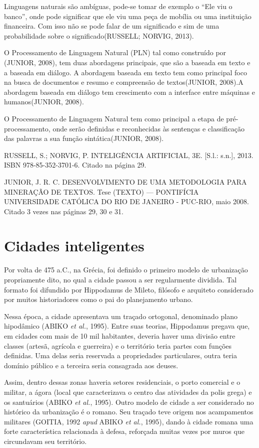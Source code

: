 Linguagens naturais são ambíguas, pode-se tomar de exemplo o “Ele viu o banco”, onde pode significar que ele viu uma peça de mobília ou uma instituição financeira. Com isso não se pode falar de um significado e sim de uma probabilidade sobre o significado(RUSSELL; NORVIG, 2013).

O Processamento de Linguagem Natural (PLN) tal como construído por (JUNIOR, 2008), tem duas abordagens principais, que são a baseada em texto e a baseada em diálogo. A abordagem baseada em texto tem como principal foco na busca de documentos e resumo e compreensão de textos(JUNIOR, 2008).A abordagem baseada em diálogo tem crescimento com a interface entre máquinas e humanos(JUNIOR, 2008). 

O Processamento de Linguagem Natural tem como principal a etapa de pré-processamento, onde serão definidas e reconhecidas às sentenças e classificação das palavras a sua função sintática(JUNIOR, 2008).

RUSSELL, S.; NORVIG, P. INTELIGÊNCIA ARTIFICIAL, 3E. [S.l.: s.n.], 2013. ISBN
978-85-352-3701-6. Citado na página 29.

JUNIOR, J. R. C. DESENVOLVIMENTO DE UMA METODOLOGIA PARA
MINERAÇÃO DE TEXTOS. Tese (TEXTO) — PONTIFÍCIA UNIVERSIDADE
CATÓLICA DO RIO DE JANEIRO - PUC-RIO, maio 2008. Citado 3 vezes nas páginas
29, 30 e 31.

\section{Cidades inteligentes} \label{s:cidades_inteligentes}

Por volta de 475 a.C., na Grécia, foi definido o primeiro modelo de urbanização propriamente dito, no qual a cidade passou a ser regularmente dividida. Tal formato foi difundido por Hippodamus de Mileto, filósofo e arquiteto considerado por muitos historiadores como o pai do planejamento urbano.

Nessa época, a cidade apresentava um traçado ortogonal, denominado plano hipodâmico (ABIKO \textit{et al.}, 1995). Entre suas teorias, Hippodamus pregava que, em cidades com mais de 10 mil habitantes, deveria haver uma divisão entre classes (artesã, agrícola e guerreira) e o território teria partes com funções definidas. Uma delas seria reservada a propriedades particulares, outra teria domínio público e a terceira seria consagrada aos deuses.

Assim, dentro dessas zonas haveria setores residenciais, o porto comercial e o militar, a ágora (local que caracterizava o centro das atividades da polis grega) e os santuários (ABIKO \textit{et al.}, 1995).
Outro modelo de cidade a ser considerado no histórico da urbanização é o romano. Seu traçado teve origem nos acampamentos militares (GOITIA, 1992 \textit{apud} ABIKO \textit{et al.}, 1995), dando à cidade romana uma forte característica relacionada à defesa, reforçada muitas vezes por muros que circundavam seu território.

